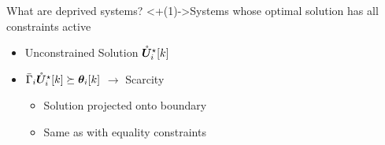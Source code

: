 \documentclass[aspectratio=169]{beamer}
\begin{document}
\begin{frame}{What are deprived systems?}{}
  \centering
  \onslide<+(1)->{Systems whose optimal solution has all constraints active}

  \begin{minipage}[t]{.55\linewidth}
    \begin{itemize}[<+(2)->]
      \item Unconstrained Solution $\mathring{\boldsymbol{U}}^{\star}_i[k]$
      \item $\bar{\Gamma}_{i}\optuncUik \succeq\thetaik$ $\to$ Scarcity
            \begin{itemize}
              \item Solution projected onto boundary
              \item Same as with equality constraints\footnotemark

            \end{itemize}
    \end{itemize}

  \end{minipage}
  \quad
  \begin{minipage}[t]{.35\linewidth}
    \small
  \end{minipage}


\end{frame}
\end{document}
